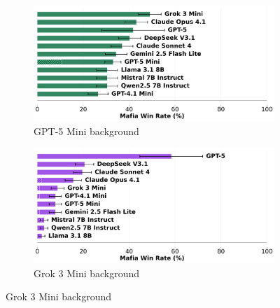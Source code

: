 \documentclass{article}
\begin{document}
\begin{figure}[htbp]
    \centering
    \begin{subfigure}[b]{0.48\textwidth}
        \centering
        \includegraphics[width=\textwidth]{../results/mafioso_gpt-5_mini_db_benchmark.png}
        \caption{GPT-5 Mini background}
        \label{fig:mafioso_gpt5mini_appendix}
    \end{subfigure}
    \hfill
    \begin{subfigure}[b]{0.48\textwidth}
        \centering
        \includegraphics[width=\textwidth]{../results/mafioso_grok_3_mini_db_benchmark.png}
        \caption{Grok 3 Mini background}
        \label{fig:mafioso_grok3_appendix}
    \end{subfigure}
    
    \vspace{0.5cm}
    

\end{figure}
\end{document}
